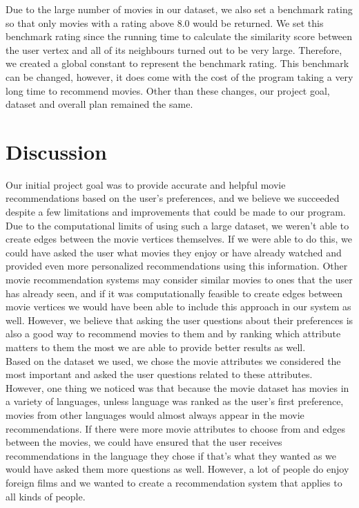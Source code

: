 \documentclass[fontsize=11pt]{article}
\begin{document}
Due to the large number of movies in our dataset, we also set a benchmark rating so that only movies with a rating above 8.0 would be returned. We set this benchmark rating since the running time to calculate the similarity score between the user vertex and all of its neighbours turned out to be very large. Therefore, we created a global constant to represent the benchmark rating. This benchmark can be changed, however, it does come with the cost of the program taking a very long time to recommend movies. Other than these changes, our project goal, dataset and overall plan remained the same.

\section*{Discussion}
Our initial project goal was to provide accurate and helpful movie recommendations based on the user's preferences, and we believe we succeeded despite a few limitations and improvements that could be made to our program. Due to the computational limits of using such a large dataset, we weren't able to create edges between the movie vertices themselves. If we were able to do this, we could have asked the user what movies they enjoy or have already watched and provided even more personalized recommendations using this information. Other movie recommendation systems may consider similar movies to ones that the user has already seen, and if it was computationally feasible to create edges between movie vertices we would have been able to include this approach in our system as well. However, we believe that asking the user questions about their preferences is also a good way to recommend movies to them and by ranking which attribute matters to them the most we are able to provide better results as well. \\

Based on the dataset we used, we chose the movie attributes we considered the most important and asked the user questions related to these attributes. However, one thing we noticed was that because the movie dataset has movies in a variety of languages, unless language was ranked as the user's first preference, movies from other languages would almost always appear in the movie recommendations. If there were more movie attributes to choose from and edges between the movies, we could have ensured that the user receives recommendations in the language they chose if that's what they wanted as we would have asked them more questions as well. However, a lot of people do enjoy foreign films and we wanted to create a recommendation system that applies to all kinds of people. \\
\end{document}
